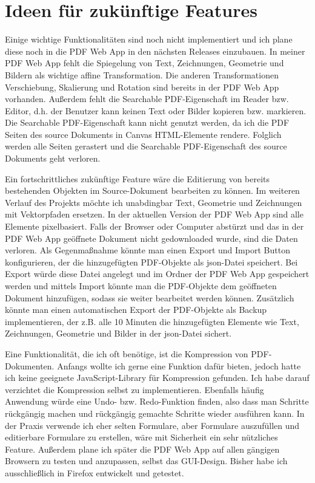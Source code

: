 \section{Ideen für zukünftige Features}
Einige wichtige Funktionalitäten sind noch nicht implementiert und ich plane diese noch in die PDF Web App in den nächsten Releases einzubauen. In meiner PDF Web App fehlt die Spiegelung von Text, Zeichnungen, Geometrie und Bildern als wichtige affine Transformation. Die anderen Transformationen Verschiebung, Skalierung und Rotation sind bereits in der PDF Web App vorhanden. Außerdem fehlt die Searchable PDF-Eigenschaft im Reader bzw. Editor, d.h. der Benutzer kann keinen Text oder Bilder kopieren bzw. markieren. Die Searchable PDF-Eigenschaft kann nicht genutzt werden, da ich die PDF Seiten des source Dokuments in Canvas HTML-Elemente rendere. Folglich werden alle Seiten gerastert und die Searchable PDF-Eigenschaft des source Dokuments geht verloren. 
\par
Ein fortschrittliches zukünftige Feature wäre die Editierung von bereits bestehenden Objekten im Source-Dokument bearbeiten zu können. Im weiteren Verlauf des Projekts möchte ich unabdingbar Text, Geometrie und Zeichnungen mit Vektorpfaden ersetzen. In der aktuellen Version der PDF Web App sind alle Elemente pixelbasiert. Falls der Browser oder Computer abstürzt und das in der PDF Web App geöffnete Dokument nicht gedownloaded wurde, sind die Daten verloren. Als Gegenmaßnahme könnte man einen Export und Import Button konfigurieren, der die hinzugefügten PDF-Objekte als \gls{json}-Datei speichert. Bei Export würde diese Datei angelegt und im Ordner der PDF Web App gespeichert werden und mittels Import könnte man die PDF-Objekte dem geöffneten Dokument hinzufügen, sodass sie weiter bearbeitet werden können. Zusätzlich könnte man einen automatischen Export der PDF-Objekte als Backup implementieren, der z.B. alle 10 Minuten die hinzugefügten Elemente wie Text, Zeichnungen, Geometrie und Bilder in der \gls{json}-Datei sichert.
\par
Eine Funktionalität, die ich oft benötige, ist die Kompression von PDF-Dokumenten. Anfangs wollte ich gerne eine Funktion dafür bieten, jedoch hatte ich keine geeignete JavaScript-Library für Kompression gefunden. Ich habe darauf verzichtet die Kompression selbst zu implementieren. Ebenfalls häufig Anwendung würde eine Undo- bzw. Redo-Funktion finden, also dass man Schritte rückgängig machen und rückgängig gemachte Schritte wieder ausführen kann. In der Praxis verwende ich eher selten Formulare, aber Formulare auszufüllen und editierbare Formulare zu erstellen, wäre mit Sicherheit ein sehr nützliches Feature. Außerdem plane ich später die PDF Web App auf allen gängigen Browsern zu testen und anzupassen, selbst das GUI-Design. Bisher habe ich ausschließlich in Firefox entwickelt und getestet.